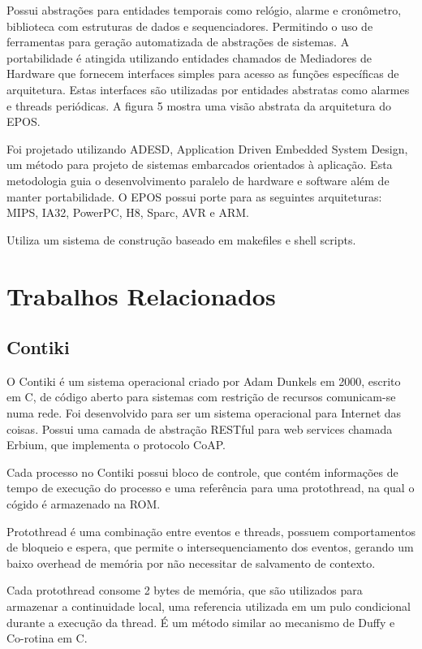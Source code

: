 Possui abstra\c{c}\~oes para entidades temporais como rel\'ogio, alarme e cron\^ometro, biblioteca com estruturas de dados e sequenciadores. Permitindo o uso de ferramentas para gera\c{c}\~ao automatizada de abstra\c{c}\~oes de sistemas. A portabilidade \'e atingida utilizando entidades chamados de Mediadores de Hardware que fornecem interfaces simples para acesso as fun\c{c}\~oes espec\'ificas de arquitetura. Estas interfaces s\~ao utilizadas por entidades abstratas como alarmes e threads peri\'odicas. A figura 5 mostra uma vis\~ao abstrata da arquitetura do EPOS.


Foi projetado utilizando ADESD, Application Driven Embedded System Design, um m\'etodo para projeto de sistemas embarcados orientados \`a aplica\c{c}\~ao. Esta metodologia guia o desenvolvimento paralelo de hardware e software al\'em de manter portabilidade. O EPOS possui porte para as seguintes arquiteturas: MIPS, IA32, PowerPC, H8, Sparc, AVR e ARM. \cite{epos}

Utiliza um sistema de constru\c{c}\~ao baseado em makefiles e shell scripts.

\section{Trabalhos Relacionados}

\subsection{Contiki}
O Contiki \'e um sistema operacional criado por Adam Dunkels em 2000, escrito em C, de c\'odigo aberto para sistemas com restri\c{c}\~ao de recursos comunicam-se numa rede. Foi desenvolvido para ser um sistema operacional para Internet das coisas. Possui uma camada de abstra\c{c}\~ao RESTful para web services chamada Erbium, que implementa o protocolo CoAP.

Cada processo no Contiki possui bloco de controle, que cont\'em informa\-\c{c}\~oes de tempo de execu\c{c}\~ao do processo e uma refer\^encia para uma protothread, na qual o c\'ogido \'e armazenado na ROM. 

Protothread \'e uma combina\c{c}\~ao entre eventos e threads, possuem comportamentos de bloqueio e espera, que permite o intersequenciamento dos eventos, gerando um baixo overhead de mem\'oria por n\~ao necessitar de salvamento de contexto.

Cada protothread consome 2 bytes de mem\'oria, que s\~ao utilizados para armazenar a continuidade local, uma referencia utilizada em um pulo condicional durante a execu\c{c}\~ao da thread. \'E um m\'etodo similar ao mecanismo de Duffy e Co-rotina em C. \cite{duffy}

